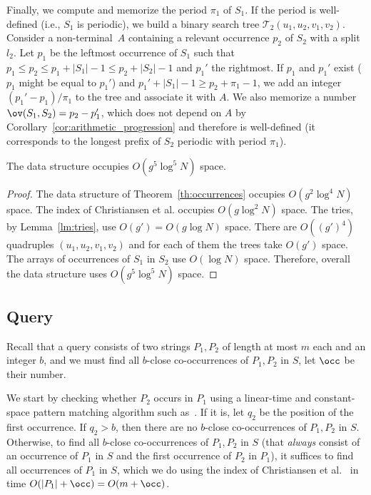 Finally, we compute and memorize the period $\pi_1$ of $S_1$. If the period is well-defined (i.e., $S_1$ is periodic), we build a binary search tree $\mathcal{T}_2(u_1, u_2, v_1, v_2)$. Consider a non-terminal~$A$ containing a relevant occurrence $p_2$ of $S_2$ with a split $l_2$.
Let $p_1$ be the leftmost occurrence of $S_1$ such that $p_1 \le  p_2 \le p_1+|S_1|-1 \le p_2 + |S_2|-1$ and $p_1'$ the rightmost. If $p_1$ and $p_1'$ exist ($p_1$ might be equal to $p_1'$) and $p_1'+|S_1|-1 \ge p_2 + \pi_1-1$, we add an integer $(p_1'-p_1)/\pi_1$ to the tree and associate it with $A$. We also memorize a number $\ov(S_1,S_2) = p_2-p_1'$, which does not depend on $A$ by Corollary~\ref{cor:arithmetic_progression} and therefore is well-defined (it corresponds to the longest prefix of $S_2$ periodic with period $\pi_1$).

\begin{claim}
The data structure occupies $O(g^5 \log^5 N)$ space.
\end{claim}
\begin{proof}
The data structure of Theorem~\ref{th:occurrences} occupies $O(g^2\log^4 N)$ space. The index of Christiansen et al. occupies $O(g \log^2 N)$ space. The tries, by Lemma~\ref{lm:tries}, use $O(g') = O(g \log N)$ space. There are $O((g')^4)$ quadruples $(u_1,u_2,v_1,v_2)$ and for each of them the trees take $O(g')$ space. The arrays of occurrences of $S_1$ in $S_2$ use $O(\log N)$ space. Therefore, overall the data structure uses $O(g^5 \log^5 N)$ space.
\end{proof}

\subsection{Query}
Recall that a query consists of two strings $P_1, P_2$ of length at most $m$ each and an integer $b$, and we must find all $b$-close co-occurrences of $P_1,P_2$ in $S$, let $\occ$ be their number. 

We start by checking whether $P_2$ occurs in $P_1$ using a linear-time and constant-space pattern matching algorithm such as~\cite{constantspacepm}. If it is, let $q_2$ be the position of the first occurrence. If $q_2 > b$, then there are no $b$-close co-occurrences of $P_1,P_2$ in $S$. Otherwise, to find all $b$-close co-occurrences of $P_1, P_2$ in $S$ (that \emph{always} consist of an occurrence of $P_1$ in $S$ and the first occurrence of $P_2$ in $P_1$), it suffices to find all occurrences of $P_1$ in $S$, which we do using the index of Christiansen et al.~\cite{talg/ChristiansenEKN21} in time $O(|P_1|+\occ) = O(m+\occ)$. 

